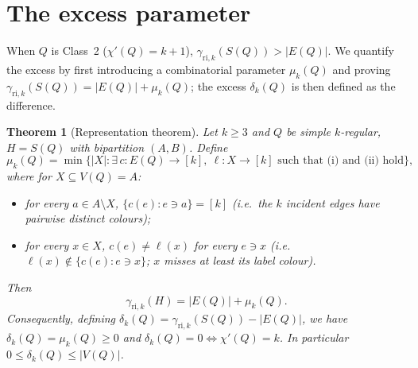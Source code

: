 \documentclass[11pt,a4paper]{article}
\theoremstyle{plain}
\newtheorem{theorem}{Theorem}[section]
\theoremstyle{definition}
\newcommand{\gri}{\gamma_{\mathrm{ri},k}}
\newcommand{\setK}{[k]}
\begin{document}
\section{The excess parameter}\label{sec:excess}

When $Q$ is Class~2 ($\chi'(Q)=k+1$), $\gri(S(Q))>|E(Q)|$. We quantify the excess by first introducing a combinatorial parameter $\mu_{k}(Q)$ and proving $\gri(S(Q))=|E(Q)|+\mu_{k}(Q)$; the excess $\delta_{k}(Q)$ is then defined as the difference.

\begin{theorem}[Representation theorem]\label{thm:representation}
Let $k\ge 3$ and $Q$ be simple $k$-regular, $H=S(Q)$ with bipartition $(A,B)$.
Define
\[
\mu_{k}(Q)=\min\{|X|: \exists\,c\colon E(Q)\to\setK,\ \ell\colon X\to\setK\text{ such that (i) and (ii) hold}\},
\]
where for $X\subseteq V(Q)=A$:
\begin{itemize}
\item[(i)] for every $a\in A\setminus X$, $\{c(e):e\ni a\}=\setK$ (i.e.\ the $k$ incident edges have pairwise distinct colours);
\item[(ii)] for every $x\in X$, $c(e)\neq\ell(x)$ for every $e\ni x$ (i.e.\ $\ell(x)\notin\{c(e):e\ni x\}$; $x$ misses at least its label colour).
\end{itemize}
Then
\[
\gri(H)=|E(Q)|+\mu_{k}(Q).
\]
Consequently, defining $\delta_{k}(Q)=\gri(S(Q))-|E(Q)|$, we have $\delta_{k}(Q)=\mu_{k}(Q)\ge0$ and $\delta_{k}(Q)=0\iff\chi'(Q)=k$. In particular $0\le\delta_{k}(Q)\le|V(Q)|$.
\end{theorem}
\end{document}
